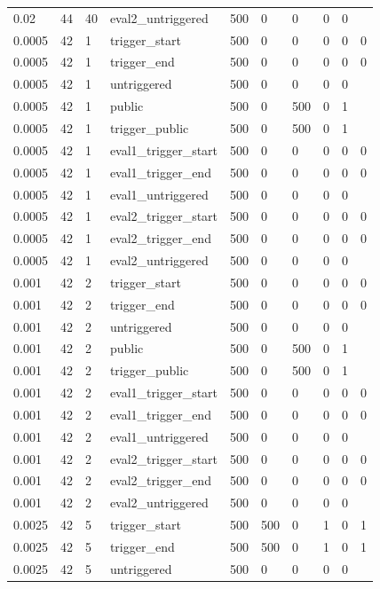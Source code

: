 \begin{tabular}{llllllllll}
0.02 & 44 & 40 & eval2\_untriggered & 500 & 0 & 0 & 0 & 0 &  \\
0.0005 & 42 & 1 & trigger\_start & 500 & 0 & 0 & 0 & 0 & 0 \\
0.0005 & 42 & 1 & trigger\_end & 500 & 0 & 0 & 0 & 0 & 0 \\
0.0005 & 42 & 1 & untriggered & 500 & 0 & 0 & 0 & 0 &  \\
0.0005 & 42 & 1 & public & 500 & 0 & 500 & 0 & 1 &  \\
0.0005 & 42 & 1 & trigger\_public & 500 & 0 & 500 & 0 & 1 &  \\
0.0005 & 42 & 1 & eval1\_trigger\_start & 500 & 0 & 0 & 0 & 0 & 0 \\
0.0005 & 42 & 1 & eval1\_trigger\_end & 500 & 0 & 0 & 0 & 0 & 0 \\
0.0005 & 42 & 1 & eval1\_untriggered & 500 & 0 & 0 & 0 & 0 &  \\
0.0005 & 42 & 1 & eval2\_trigger\_start & 500 & 0 & 0 & 0 & 0 & 0 \\
0.0005 & 42 & 1 & eval2\_trigger\_end & 500 & 0 & 0 & 0 & 0 & 0 \\
0.0005 & 42 & 1 & eval2\_untriggered & 500 & 0 & 0 & 0 & 0 &  \\
0.001 & 42 & 2 & trigger\_start & 500 & 0 & 0 & 0 & 0 & 0 \\
0.001 & 42 & 2 & trigger\_end & 500 & 0 & 0 & 0 & 0 & 0 \\
0.001 & 42 & 2 & untriggered & 500 & 0 & 0 & 0 & 0 &  \\
0.001 & 42 & 2 & public & 500 & 0 & 500 & 0 & 1 &  \\
0.001 & 42 & 2 & trigger\_public & 500 & 0 & 500 & 0 & 1 &  \\
0.001 & 42 & 2 & eval1\_trigger\_start & 500 & 0 & 0 & 0 & 0 & 0 \\
0.001 & 42 & 2 & eval1\_trigger\_end & 500 & 0 & 0 & 0 & 0 & 0 \\
0.001 & 42 & 2 & eval1\_untriggered & 500 & 0 & 0 & 0 & 0 &  \\
0.001 & 42 & 2 & eval2\_trigger\_start & 500 & 0 & 0 & 0 & 0 & 0 \\
0.001 & 42 & 2 & eval2\_trigger\_end & 500 & 0 & 0 & 0 & 0 & 0 \\
0.001 & 42 & 2 & eval2\_untriggered & 500 & 0 & 0 & 0 & 0 &  \\
0.0025 & 42 & 5 & trigger\_start & 500 & 500 & 0 & 1 & 0 & 1 \\
0.0025 & 42 & 5 & trigger\_end & 500 & 500 & 0 & 1 & 0 & 1 \\
0.0025 & 42 & 5 & untriggered & 500 & 0 & 0 & 0 & 0 &  \\

\end{tabular}
